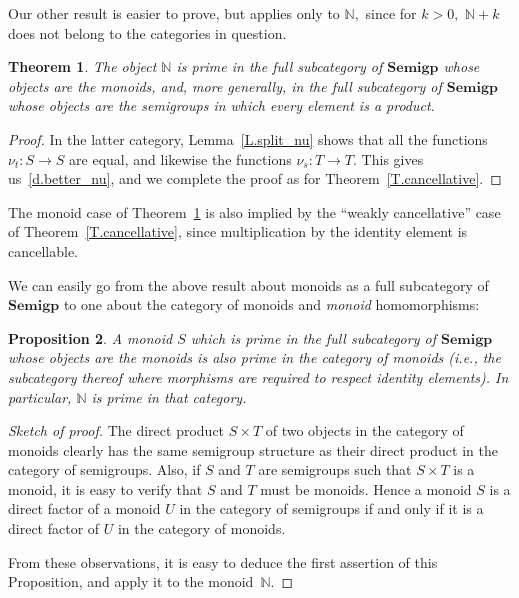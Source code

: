 \documentclass{amsart}
\newtheorem{theorem}{Theorem}
\newtheorem{proposition}[theorem]{Proposition}
\numberwithin{equation}{section}
\numberwithin{theorem}{section}
\newcommand{\N}{\mathbb{N}}
\begin{document}
Our other result is easier to prove, but applies
only to $\N,$ since for $k>0,$ $\N\!+\!k$ does not belong
to the categories in question.

\begin{theorem}\label{T.monoids&}
The object $\N$ is prime in the full subcategory of
$\mathbf{Semigp}$ whose objects are the monoids, and, more generally,
in the full subcategory of $\mathbf{Semigp}$ whose objects are the
semigroups in which every element is a product.
\end{theorem}

\begin{proof}
In the latter category, Lemma~\ref{L.split_nu} shows that all
the functions $\nu_t: S\to S$ are equal, and likewise
the functions $\nu_s: T\to T.$
This gives us~\eqref{d.better_nu}, and we complete the
proof as for Theorem~\ref{T.cancellative}.
\end{proof}

The monoid case of Theorem~\ref{T.monoids&} is also
implied by the ``weakly cancellative'' case of
Theorem~\ref{T.cancellative}, since multiplication by
the identity element is cancellable.

We can easily go from the above result about monoids
as a full subcategory of $\mathbf{Semigp}$
to one about the category of monoids and {\em monoid} homomorphisms:

\begin{proposition}\label{P.monoids_as_such}
A monoid $S$ which is prime in the full subcategory of $\mathbf{Semigp}$
whose objects are the monoids is also prime in the category of monoids
{\rm(}i.e., the subcategory thereof where morphisms are required
to respect identity elements{\rm)}.
In particular, $\N$ is prime in that category.
\end{proposition}

\begin{proof}[Sketch of proof]
The direct product $S\times T$ of two objects in the category
of monoids clearly has the same semigroup
structure as their direct product in the category of semigroups.
Also, if $S$ and $T$ are semigroups such that
$S\times T$ is a monoid, it is easy to verify that
$S$ and $T$ must be monoids.
Hence a monoid $S$ is a direct factor of a monoid $U$ in the
category of semigroups if and only if it is
a direct factor of $U$ in the category of monoids.

From these observations, it is easy to deduce the first assertion
of this Proposition, and apply it to the monoid~$\N.$
\end{proof}
\end{document}
